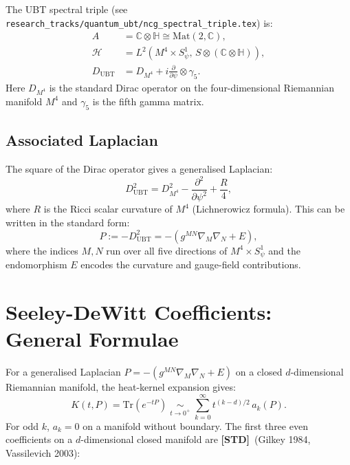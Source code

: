 \documentclass[12pt,a4paper]{article}
\theoremstyle{definition}
\theoremstyle{remark}
\newcommand{\STD}{\textbf{[STD]}}
\begin{document}
The UBT spectral triple (see
\texttt{research\_tracks/quantum\_ubt/ncg\_spectral\_triple.tex}) is:
\begin{align}
  A &= \mathbb{C}\otimes\mathbb{H} \cong \mathrm{Mat}(2,\mathbb{C}), \\
  \mathcal{H} &= L^2(M^4\times S^1_\psi,\, S\otimes(\mathbb{C}\otimes\mathbb{H})), \\
  D_{\mathrm{UBT}} &= D_{M^4} + i\frac{\partial}{\partial\psi}\otimes\gamma_5.
  \label{eq:D_ubt}
\end{align}
Here $D_{M^4}$ is the standard Dirac operator on the four-dimensional Riemannian
manifold $M^4$ and $\gamma_5$ is the fifth gamma matrix.

\subsection{Associated Laplacian}

The square of the Dirac operator gives a generalised Laplacian:
\begin{equation}
  D_{\mathrm{UBT}}^2 = D_{M^4}^2 - \frac{\partial^2}{\partial\psi^2}
  + \frac{R}{4},
  \label{eq:D2}
\end{equation}
where $R$ is the Ricci scalar curvature of $M^4$ (Lichnerowicz formula).
This can be written in the standard form:
\begin{equation}
  P := -D_{\mathrm{UBT}}^2 = -\left(g^{MN}\nabla_M\nabla_N + E\right),
  \label{eq:P_form}
\end{equation}
where the indices $M,N$ run over all five directions of $M^4\times S^1_\psi$
and the endomorphism $E$ encodes the curvature and gauge-field contributions.

\section{Seeley-DeWitt Coefficients: General Formulae}
\label{sec:general_formulae}

For a generalised Laplacian $P = -(g^{MN}\nabla_M\nabla_N + E)$ on a
closed $d$-dimensional Riemannian manifold, the heat-kernel expansion gives:
\begin{equation}
  K(t,P) = \mathrm{Tr}(e^{-tP})
  \;\underset{t\to0^+}{\sim}\;
  \sum_{k=0}^{\infty} t^{(k-d)/2}\,a_k(P).
  \label{eq:heat_kernel}
\end{equation}
For odd $k$, $a_k = 0$ on a manifold without boundary.
The first three even coefficients on a $d$-dimensional closed manifold are
\STD\ (Gilkey 1984, Vassilevich 2003):
\end{document}
